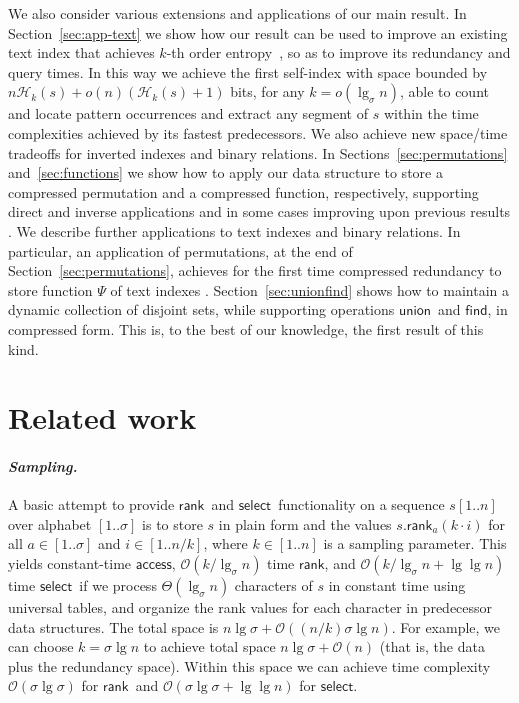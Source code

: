 \documentclass[11pt]{article}
\newcommand{\Oh}[1]
    {\ensuremath{\mathcal{O}\left( {#1} \right)}}
\newcommand{\access}
    {\ensuremath{\mathsf{access}}}
\newcommand{\rank}
    {\ensuremath{\mathsf{rank}}}
\newcommand{\select}
    {\ensuremath{\mathsf{select}}}
\newcommand{\union}
    {\ensuremath{\mathsf{union}}}
\newcommand{\find}
    {\ensuremath{\mathsf{find}}}
\newcommand{\HH}{\mathcal{H}}
\newcommand{\Hk}{\HH_k}
\begin{document}
We also consider various extensions and applications of our main
result.
In Section~\ref{sec:app-text} we show how our result can be used to
improve an existing text index that achieves $k$-th order
entropy~\cite{FMMN07,BHMR07}, so as to improve its redundancy and
query times. In this way we achieve the first self-index with space
bounded by $n\Hk(s) + o(n)(\Hk(s)+1)$ bits, for any $k=o(\lg_\sigma
n)$, able to count and locate pattern occurrences and extract any
segment of $s$ within the time complexities achieved by its fastest
predecessors. We also achieve new space/time tradeoffs for inverted
indexes and binary relations.
In Sections~\ref{sec:permutations} and~\ref{sec:functions} we show how
to apply our data structure to store a compressed permutation and a
compressed function, respectively, supporting direct and inverse
applications and in some cases improving upon previous results
\cite{BN09,BN11,MRRR03,HKP09}. We describe further applications to
text indexes and binary relations.  In particular, an application of
permutations, at the end of Section~\ref{sec:permutations}, achieves
for the first time compressed redundancy to store function $\Psi$ of
text indexes \cite{GV05,GGV03,Sad03}.
Section~\ref{sec:unionfind} shows how to maintain a dynamic collection
of disjoint sets, while supporting operations \union\ and \find, in
compressed form. This is, to the best of our knowledge, the first
result of this kind.

\section{Related work} \label{sec:related}

\paragraph{\em Sampling.}
A basic attempt to provide \rank\ and \select\ functionality on a
sequence $s[1..n]$ over alphabet $[1..\sigma]$ is to store $s$ in
plain form and the values $s.\rank_a(k\cdot i)$ for all $a \in
[1..\sigma]$ and $i \in [1..n/k]$, where $k \in [1..n]$ is a sampling
parameter.  This yields constant-time \access, $\Oh{k/\lg_\sigma n}$
time \rank, and $\Oh{k/\lg_\sigma n + \lg\lg n}$ time \select\ if we
process $\Theta(\lg_\sigma n)$ characters of $s$ in constant time
using universal tables, and organize the rank values for each
character in predecessor data structures.  The total space is $n
\lg\sigma + \Oh{(n/k)\sigma\lg n}$. For example, we can choose
$k=\sigma\lg n$ to achieve total space $n\lg\sigma + \Oh{n}$ (that is,
the data plus the redundancy space). Within this space we can achieve
time complexity $\Oh{\sigma\lg\sigma}$ for \rank\ and
$\Oh{\sigma\lg\sigma + \lg\lg n}$ for \select.
\end{document}
